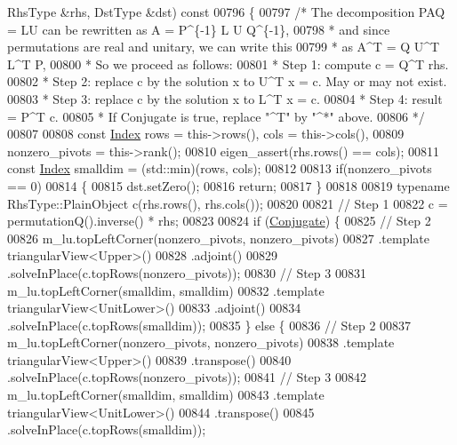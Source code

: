 \begin{DoxyCode}
      RhsType &rhs, DstType &dst)\textcolor{keyword}{ const}
00796 \textcolor{keyword}{}\{
00797   \textcolor{comment}{/* The decomposition PAQ = LU can be rewritten as A = P^\{-1\} L U Q^\{-1\},}
00798 \textcolor{comment}{   * and since permutations are real and unitary, we can write this}
00799 \textcolor{comment}{   * as   A^T = Q U^T L^T P,}
00800 \textcolor{comment}{   * So we proceed as follows:}
00801 \textcolor{comment}{   * Step 1: compute c = Q^T rhs.}
00802 \textcolor{comment}{   * Step 2: replace c by the solution x to U^T x = c. May or may not exist.}
00803 \textcolor{comment}{   * Step 3: replace c by the solution x to L^T x = c.}
00804 \textcolor{comment}{   * Step 4: result = P^T c.}
00805 \textcolor{comment}{   * If Conjugate is true, replace "^T" by "^*" above.}
00806 \textcolor{comment}{   */}
00807 
00808   \textcolor{keyword}{const} \hyperlink{group___core___module_a554f30542cc2316add4b1ea0a492ff02}{Index} rows = this->rows(), cols = this->cols(),
00809     nonzero\_pivots = this->rank();
00810    eigen\_assert(rhs.rows() == cols);
00811   \textcolor{keyword}{const} \hyperlink{group___core___module_a554f30542cc2316add4b1ea0a492ff02}{Index} smalldim = (std::min)(rows, cols);
00812 
00813   \textcolor{keywordflow}{if}(nonzero\_pivots == 0)
00814   \{
00815     dst.setZero();
00816     \textcolor{keywordflow}{return};
00817   \}
00818 
00819   \textcolor{keyword}{typename} RhsType::PlainObject c(rhs.rows(), rhs.cols());
00820 
00821   \textcolor{comment}{// Step 1}
00822   c = permutationQ().inverse() * rhs;
00823 
00824   \textcolor{keywordflow}{if} (\hyperlink{class_eigen_1_1_conjugate}{Conjugate}) \{
00825     \textcolor{comment}{// Step 2}
00826     m\_lu.topLeftCorner(nonzero\_pivots, nonzero\_pivots)
00827         .template triangularView<Upper>()
00828         .adjoint()
00829         .solveInPlace(c.topRows(nonzero\_pivots));
00830     \textcolor{comment}{// Step 3}
00831     m\_lu.topLeftCorner(smalldim, smalldim)
00832         .template triangularView<UnitLower>()
00833         .adjoint()
00834         .solveInPlace(c.topRows(smalldim));
00835   \} \textcolor{keywordflow}{else} \{
00836     \textcolor{comment}{// Step 2}
00837     m\_lu.topLeftCorner(nonzero\_pivots, nonzero\_pivots)
00838         .template triangularView<Upper>()
00839         .transpose()
00840         .solveInPlace(c.topRows(nonzero\_pivots));
00841     \textcolor{comment}{// Step 3}
00842     m\_lu.topLeftCorner(smalldim, smalldim)
00843         .template triangularView<UnitLower>()
00844         .transpose()
00845         .solveInPlace(c.topRows(smalldim));

\end{DoxyCode}
